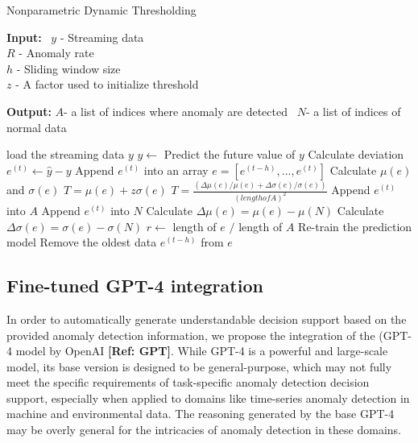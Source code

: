 \documentclass[final,3p,times,twocolumn]{elsarticle}
\begin{document}
\begin{algorithm}[h]
\caption{Nonparametric Dynamic Thresholding}
\label{DT}

\textbf{Input:} \
$y$ - Streaming data\\
\hspace*{1.1cm} $R$ - Anomaly rate \\
\hspace*{1.1cm} $h$ - Sliding window size \\
\hspace*{1.1cm} $z$ - A factor used to initialize threshold \

\textbf{Output:} 
$A$- a list of indices where anomaly are detected \
$N$- a list of indices of normal data\
\begin{algorithmic}[1]

	\State load the streaming data $y$
	\State $\hat{y} \gets$  Predict the future value of $y$
	\State Calculate deviation $e^{(t)} \gets \hat{y} - y$
	\State Append $e^{(t)}$ into an array $e = [e^{(t-h)}, ... , e^{(t)}]$
	\State Calculate $\mu(e)$ and $\sigma(e)$
	\IF{($T$ is none)}
		\State $T = \mu(e) + z\sigma(e)$
	\ELSE{}
		\State $T= \frac{(\Delta\mu(e)/\mu(e) + \Delta\sigma(e)/\sigma(e))}{(length of A)^2}$
	\ENDIF
		\STATE Append $e^{(t)}$ into $A$ 
	\ELSE{}
		\STATE Append $e^{(t)}$ into $N$
	\ENDIF
	\State Calculate $\Delta\mu(e) = \mu(e) - \mu(N)$
	\State Calculate $\Delta\sigma(e) = \sigma(e) - \sigma(N)$
	\State $r \gets$ length of $e$ $/$ length of $A$
	\IF{$r > R$}
		\STATE Re-train the prediction model
	\ENDIF
		\STATE Remove the oldest data $e^{(t-h)}$ from $e$
	\ENDIF
\ENDWHILE
\end{algorithmic}
\end{algorithm}

\subsection{Fine-tuned GPT-4 integration}
In order to automatically generate understandable decision support based on the provided anomaly detection information, we propose the integration of the (GPT-4 model by OpenAI \textbf{[Ref: GPT]}. While GPT-4 is a powerful and large-scale model, its base version is designed to be general-purpose, which may not fully meet the specific requirements of task-specific anomaly detection decision support, especially when applied to domains like time-series anomaly detection in machine and environmental data. The reasoning generated by the base GPT-4 may be overly general for the intricacies of anomaly detection in these domains.
\end{document}
